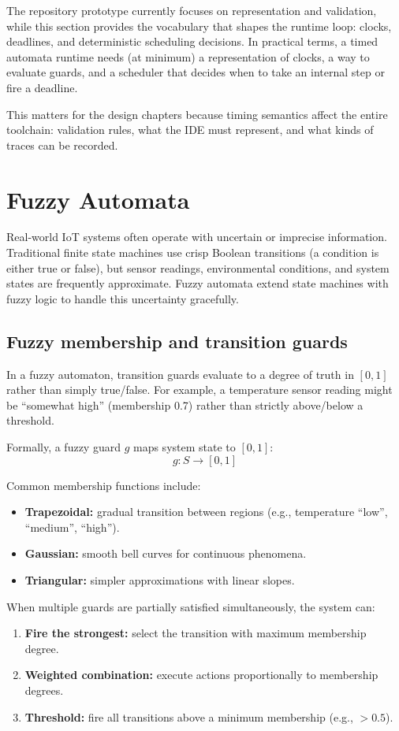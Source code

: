 The repository prototype currently focuses on representation and validation, while this section provides the vocabulary that shapes the runtime loop: clocks, deadlines, and deterministic scheduling decisions.
In practical terms, a timed automata runtime needs (at minimum) a representation of clocks, a way to evaluate guards, and a scheduler that decides when to take an internal step or fire a deadline.

This matters for the design chapters because timing semantics affect the entire toolchain: validation rules, what the IDE must represent, and what kinds of traces can be recorded.

\section{Fuzzy Automata}

Real-world IoT systems often operate with uncertain or imprecise information.
Traditional finite state machines use crisp Boolean transitions (a condition is either true or false), but sensor readings, environmental conditions, and system states are frequently approximate.
Fuzzy automata extend state machines with fuzzy logic to handle this uncertainty gracefully.

\subsection{Fuzzy membership and transition guards}

In a fuzzy automaton, transition guards evaluate to a degree of truth in $[0,1]$ rather than simply true/false.
For example, a temperature sensor reading might be ``somewhat high'' (membership 0.7) rather than strictly above/below a threshold.

Formally, a fuzzy guard $g$ maps system state to $[0,1]$:
\[
g: S \rightarrow [0,1]
\]

Common membership functions include:
\begin{itemize}
  \item \textbf{Trapezoidal:} gradual transition between regions (e.g., temperature ``low'', ``medium'', ``high'').
  \item \textbf{Gaussian:} smooth bell curves for continuous phenomena.
  \item \textbf{Triangular:} simpler approximations with linear slopes.
\end{itemize}

When multiple guards are partially satisfied simultaneously, the system can:
\begin{enumerate}
  \item \textbf{Fire the strongest:} select the transition with maximum membership degree.
  \item \textbf{Weighted combination:} execute actions proportionally to membership degrees.
  \item \textbf{Threshold:} fire all transitions above a minimum membership (e.g., $> 0.5$).
\end{enumerate}

